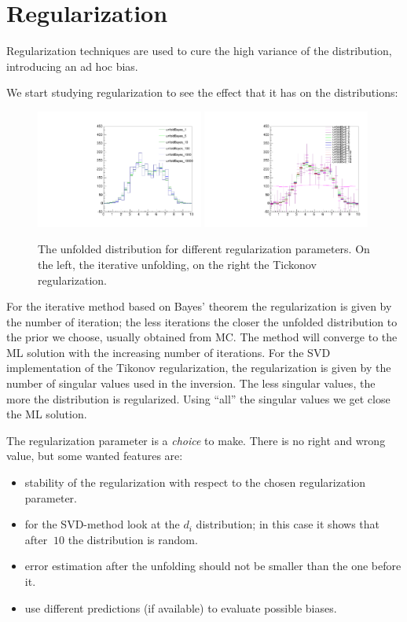 \documentclass[a4paper,11pt]{article}
\begin{document}
\FloatBarrier
\section{Regularization}
Regularization techniques are used to cure the high variance of the distribution, introducing an ad hoc bias. 

We start studying regularization to see the effect that it has on the distributions:
\begin{figure}[H]
	\centering
	\includegraphics[width=0.49\textwidth]{figs/unfold-bayes-reg.pdf}
	\includegraphics[width=0.49\textwidth]{figs/unfold-svd-reg.pdf}
	\caption{ \label{fig:sol:reg} The unfolded distribution for different regularization parameters. On the left, the iterative unfolding, on the right the Tickonov regularization. }
\end{figure}

For the iterative method based on Bayes' theorem the regularization is given by the number of iteration; the less iterations the closer the unfolded distribution to the prior we choose, usually obtained from \gls{MC}. The method will converge to the \gls{ML} solution with the increasing number of iterations.
For the \gls{SVD} implementation of the Tikonov regularization, the regularization is given by the number of singular values used in the inversion. The less singular values, the more the distribution is regularized. Using ``all'' the singular values we get close the \gls{ML} solution.

The regularization parameter is a \emph{choice} to make. 
There is no right and wrong value, but some wanted features are:
\begin{itemize}
	\item stability of the regularization with respect to the chosen regularization parameter.
	\item for the \gls{SVD}-method look at the $d_i$ distribution; in this case it shows that after $~10$ the distribution is random.
	\item error estimation after the unfolding should not be smaller than the one before it.
	\item use different predictions (if available) to evaluate possible biases.
\end{itemize}
\end{document}
